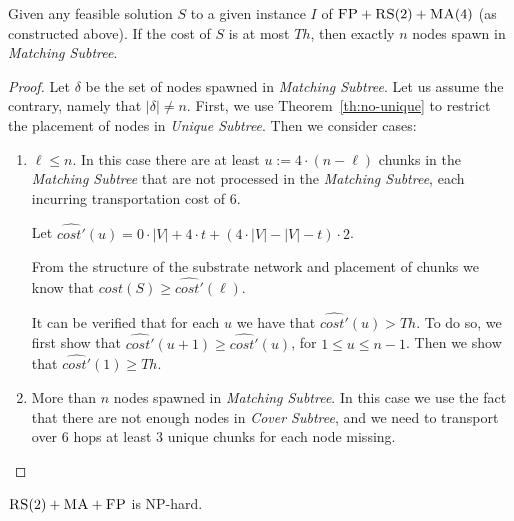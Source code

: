 \documentclass[preprint,12pt]{elsarticle}
\newcommand{\FP}{\textsc{FP}}
\newcommand{\RS}{\textsc{RS}}
\newcommand{\MA}{\textsc{MA}}
\newcommand{\Solution}{S}
\newcommand{\CostSol}{\textit{cost}(\Solution)}
\newcommand{\CostEstimTwo}{\widehat{cost'}}
\newcommand{\numNodes}{\ensuremath{|V|}}
\newcommand{\UnqSubtree}{{{\emph{Unique Subtree}}}}
\newcommand{\MatchSubtree}{{\emph{Matching Subtree}}}
\newcommand{\CoverSubtree}{{\emph{Cover Subtree}}}
\newcommand{\SpawnedMatchSubtree}{\delta}
\newcommand{\Thr}{\ensuremath{Th}}
\begin{document}
\begin{lemma}
  Given any feasible solution $\Solution$ to a given instance $I$ of
  $\FP+\RS(2)+\MA(4)$ (as constructed above). If the cost of
  $\Solution$ is at most $\Thr$, then exactly $n$ nodes spawn in
  \MatchSubtree.
  \label{th:np-balance}
\end{lemma}
\begin{proof}
  Let $\SpawnedMatchSubtree$ be the set of nodes spawned in
  {\MatchSubtree}.  Let us assume the contrary, namely that
  $|\SpawnedMatchSubtree| \neq n$.  First, we use
  Theorem~\ref{th:no-unique} to restrict the placement of nodes in
  \UnqSubtree. Then we consider cases:
  \begin{enumerate}
    
    \item $\ell \leq n$. In this case there are at least
    $u := 4 \cdot (n-\ell)$ chunks in the {\MatchSubtree} that are not
    processed in the {\MatchSubtree}, each incurring transportation
    cost of $6$.

    Let
    $\CostEstimTwo(u) = 0\cdot \numNodes + 4\cdot t + (4\cdot
    \numNodes - \numNodes - t)\cdot 2$.

    From the structure of the substrate network and placement of
    chunks we know that $\CostSol \geq \CostEstimTwo(\ell)$.

    It can be verified that for each $u$ we have that
    $\CostEstimTwo(u) > \Thr$. To do so, we first show that
    $\CostEstimTwo(u+1) \geq \CostEstimTwo(u)$, for
    $1\leq u \leq n-1$. Then we show that
    $\CostEstimTwo(1) \geq \Thr$.

    \item More than $n$ nodes spawned in \MatchSubtree. In this case
    we use the fact that there are not enough nodes in
    {\CoverSubtree}, and we need to transport over $6$ hops at least 3
    unique chunks for each node missing.
  \end{enumerate}
\end{proof}

\begin{theorem}
  $\RS(2)+\MA+\FP$ is NP-hard.
\end{theorem}
\end{document}
